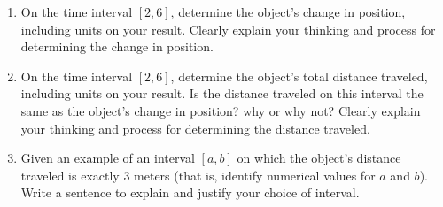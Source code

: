 \documentclass[11 pt]{article}
\newcommand{\tr}{\vspace{0.5in}}
\newcommand{\lr}{\vspace{1.0in}}
\newcommand{\be}{\begin{enumerate}}
\newcommand{\ee}{\end{enumerate}}
\begin{document}
\begin{enumerate}
	\be
	
		\item On the time interval $[2,6]$, determine the object's change in position, including units on your result.  Clearly explain your thinking and process for determining the change in position.
		
		\lr \tr
		
		\item On the time interval $[2,6]$, determine the object's total distance traveled, including units on your result.  Is the distance traveled on this interval the same as the object's change in position?  why or why not? Clearly explain your thinking and process for determining the  distance traveled.
		
		\lr \tr
		
		\item Given an example of an interval $[a,b]$ on which the object's distance traveled is exactly 3 meters (that is, identify numerical values for $a$ and $b$).  Write a sentence to explain and justify your choice of interval.
		
	\ee

  \end{enumerate}
\end{document}
